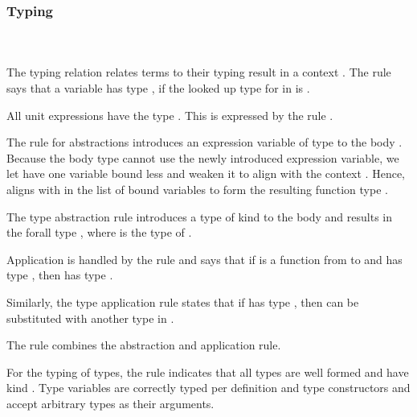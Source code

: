 \subsubsection{Typing}\hfill\\\\
The typing relation    \Data{:}  relates terms  to their typing result  in a context .
\FTyping
The rule  says that a variable   has type , if the looked up type for  in  is . 

\noindent All unit expressions  have the type . This is expressed by the rule .

\noindent The rule for abstractions  introduces an expression variable of type  to the body . 
Because the body type  cannot use the newly introduced expression variable, we let  have one variable bound less and weaken it to align with the context   . 
Hence,  aligns with  in the list of bound variables to form the resulting function type   . 

\noindent The type abstraction rule  introduces a type of kind  to the body  and results in the forall type  , where  is the type of . 

\noindent Application is handled by the rule  and says that if  is a function from  to  and  has type , then    has type . 

\noindent Similarly, the type application rule  states that if  has type  , then  can be substituted with another type  in . 

\noindent The rule  combines the abstraction and application rule.

\noindent For the typing of types, the rule  indicates that all types  are well formed and have kind . Type variables are correctly typed per definition and type constructors  and  accept arbitrary types as their arguments.

